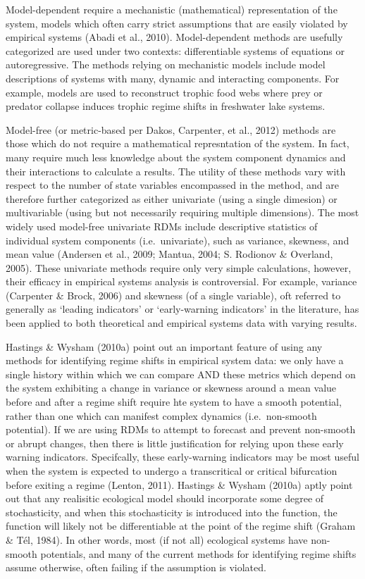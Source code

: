 \documentclass[12pt,twoside,openany]{reedthesis}
\begin{document}
Model-dependent require a mechanistic (mathematical) representation of the system, models which often carry strict assumptions that are easily violated by empirical systems (Abadi et al., 2010). Model-dependent methods are usefully categorized are used under two contexts: differentiable systems of equations or autoregressive. The methods relying on mechanistic models include model descriptions of systems with many, dynamic and interacting components. For example, models are used to reconstruct trophic food webs where prey or predator collapse induces trophic regime shifts in freshwater lake systems.

Model-free (or metric-based per Dakos, Carpenter, et al., 2012) methods are those which do not require a mathematical represntation of the system. In fact, many require much less knowledge about the system component dynamics and their interactions to calculate a results. The utility of these methods vary with respect to the number of state variables encompassed in the method, and are therefore further categorized as either univariate (using a single dimesion) or multivariable (using but not necessarily requiring multiple dimensions). The most widely used model-free univariate RDMs include descriptive statistics of individual system components (i.e.~univariate), such as variance, skewness, and mean value (Andersen et al., 2009; Mantua, 2004; S. Rodionov \& Overland, 2005). These univariate methods require only very simple calculations, however, their efficacy in empirical systems analysis is controversial. For example, variance (Carpenter \& Brock, 2006) and skewness (of a single variable), oft referred to generally as `leading indicators' or `early-warning indicators' in the literature, has been applied to both theoretical and empirical systems data with varying results.

Hastings \& Wysham (2010a) point out an important feature of using any methods for identifying regime shifts in empirical system data: we only have a single history within which we can compare AND these metrics which depend on the system exhibiting a change in variance or skewness around a mean value before and after a regime shift require hte system to have a smooth potential, rather than one which can manifest complex dynamics (i.e.~non-smooth potential). If we are using RDMs to attempt to forecast and prevent non-smooth or abrupt changes, then there is little justification for relying upon these early warning indicators. Specifcally, these early-warning indicators may be most useful when the system is expected to undergo a transcritical or critical bifurcation before exiting a regime (Lenton, 2011). Hastings \& Wysham (2010a) aptly point out that any realisitic ecological model should incorporate some degree of stochasticity, and when this stochasticity is introduced into the function, the function will likely not be differentiable at the point of the regime shift (Graham \& Tél, 1984). In other words, most (if not all) ecological systems have non-smooth potentials, and many of the current methods for identifying regime shifts assume otherwise, often failing if the assumption is violated.
\end{document}
